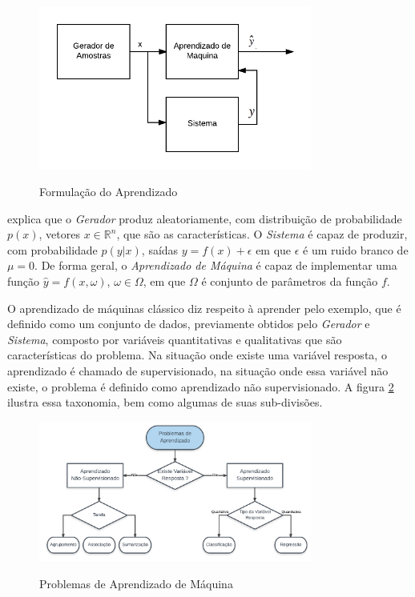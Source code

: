 \begin{figure}[!htb]
	\centering
	\caption{Formulação do Aprendizado} 
	\includegraphics[width=0.8\textwidth]{./04-figuras/MLForm.png}
	\label{fig:MLFormulation}
\end{figure}

 explica que o \textit{Gerador} produz aleatoriamente, com distribuição de probabilidade $p(x)$, vetores $x \in {\mathbb {R}} ^{n}$, que são as características. O \textit{Sistema} é capaz de produzir, com probabilidade $p(y | x)$, saídas $y = f(x) + \epsilon$ em que $\epsilon$ é um ruido branco de $\mu = 0$. De forma geral, o \textit{Aprendizado de Máquina} é capaz de implementar uma função $\hat{y} = f(x, \omega)$, $\omega \in \Omega$, em que $\Omega$ é conjunto de parâmetros da função $f$.

O aprendizado de máquinas clássico diz respeito à aprender pelo exemplo, que é definido como um conjunto de dados, previamente obtidos pelo \textit{Gerador} e \textit{Sistema}, composto por variáveis quantitativas e qualitativas que são características do problema. Na situação onde existe uma variável resposta, o aprendizado é chamado de supervisionado, na situação onde essa variável não existe, o problema é definido como aprendizado não supervisionado. A figura \ref{fig:MLProblems} ilustra essa taxonomia, bem como algumas de suas sub-divisões.


\begin{figure}[!htb]
	\centering
	\caption{Problemas de Aprendizado de Máquina} 
	\includegraphics[width=0.8\textwidth]{./04-figuras/MLProblems.png}
	\label{fig:MLProblems}
\end{figure}
